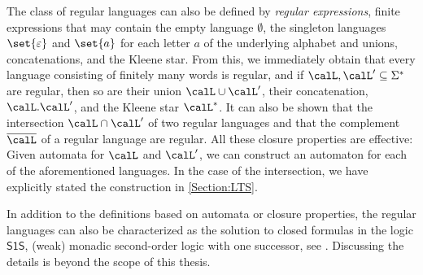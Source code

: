 \documentclass[../../diss.tex]{subfiles}
\begin{document}
The class of regular languages can also be defined by \emph{regular expressions}, finite expressions that may contain the empty language $\emptyset$, the singleton languages $\set{\eps}$ and $\set{a}$ for each letter $a$ of the underlying alphabet and unions, concatenations, and the Kleene star.
From this, we immediately obtain that every language consisting of finitely many words is regular, and if $\calL, \calL' \subseteq \Sigma^*$ are regular, then so are their union $\calL \cup \calL'$, their concatenation, $\calL.\calL'$, and the Kleene star $\calL^*$.
It can also be shown that the intersection $\calL \cap \calL'$ of two regular languages and that the complement $\overline{\calL}$ of a regular language are regular.
All these closure properties are effective:
Given automata for $\calL$ and $\calL'$, we can construct an automaton for each of the aforementioned languages.
In the case of the intersection, we have explicitly stated the construction in \cref{Section:LTS}.

In addition to the definitions based on automata or closure properties, the regular languages can also be characterized as the solution to closed formulas in the logic $\mathsf{S1S}$, (weak) monadic second-order logic with one successor, see \eg \cite{KhoussainovN01}.
Discussing the details is beyond the scope of this thesis.
\end{document}
